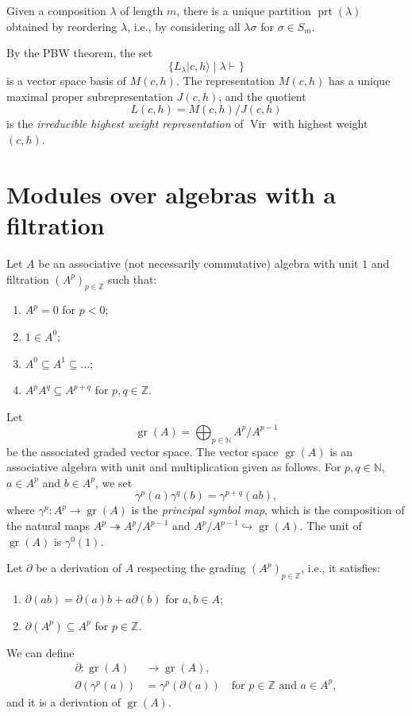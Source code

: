 \documentclass[a4paper, 12pt, reqno]{amsart}
\theoremstyle{remark}
\DeclareMathOperator{\Vir}{Vir}
\DeclareMathOperator{\gr}{gr}
\DeclareMathOperator{\prt}{prt}
\begin{document}
Given a composition $\lambda$ of length $m$, there is a unique partition $\prt(\lambda)$ obtained by reordering $\lambda$, i.e., by considering all $\lambda\sigma$ for $\sigma \in S_m$.

By the PBW theorem, the set
\begin{equation*}
  \{L_{\lambda}|c, h\rangle \mid \lambda \vdash\}
\end{equation*}
is a vector space basis of $M(c, h)$.
The representation $M(c, h)$ has a unique maximal proper subrepresentation $J(c, h)$, and the quotient
\begin{equation*}
  L(c, h) = M(c, h)/J(c, h)
\end{equation*}
is the \emph{irreducible highest weight representation} of $\Vir$ with highest weight $(c, h)$.

\section{Modules over algebras with a filtration}
\label{sec:modul-over-algebr}

Let $A$ be an associative (not necessarily commutative) algebra with unit $1$ and filtration $(A^p)_{p \in \mathbb{Z}}$ such that:
\begin{enumerate}
\item $A^p = 0$ for $p < 0$;
\item $1 \in A^0$;
\item $A^0 \subseteq A^1 \subseteq \dots$;
\item $A^pA^q \subseteq A^{p + q}$ for $p, q \in \mathbb{Z}$.
\end{enumerate}
Let
\begin{equation*}
  \gr(A) = \bigoplus_{p \in \mathbb{N}}A^p/A^{p - 1}
\end{equation*}
be the associated graded vector space.
The vector space $\gr(A)$ is an associative algebra with unit and multiplication given as follows.
For $p, q \in \mathbb{N}$, $a \in A^p$ and $b \in A^p$, we set
\begin{equation*}
  \gamma^p(a)\gamma^q(b) = \gamma^{p + q}(ab),
\end{equation*}
where $\gamma^p: A^p \to \gr(A)$ is the \emph{principal symbol map}, which is the composition of the natural maps $A^p \twoheadrightarrow A^p/A^{p - 1}$ and $A^p/A^{p - 1} \hookrightarrow \gr(A)$.
The unit of $\gr(A)$ is $\gamma^0(1)$.

Let $\partial$ be a derivation of $A$ respecting the grading $(A^p)_{p \in \mathbb{Z}}$, i.e., it satisfies:
\begin{enumerate}
\item $\partial(ab) = \partial(a)b + a\partial(b)$ for $a, b \in A$;
\item $\partial(A^p) \subseteq A^p$ for $p \in \mathbb{Z}$.
\end{enumerate}
We can define
\begin{align*}
  \partial: \gr(A) &\to \gr(A), \\
  \partial(\gamma^p(a)) &= \gamma^p(\partial(a)) \quad \text{for $p \in \mathbb{Z}$ and $a \in A^p$},
\end{align*}
and it is a derivation of $\gr(A)$.
\end{document}
